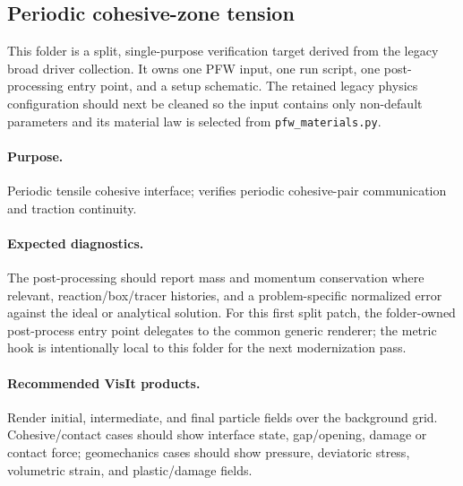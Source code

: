\subsection{Periodic cohesive-zone tension}
\label{sec:cohesiveZonePeriodic}

This folder is a split, single-purpose verification target derived from the
legacy broad driver collection.  It owns one PFW input, one run script, one
post-processing entry point, and a setup schematic.  The retained legacy physics
configuration should next be cleaned so the input contains only non-default
parameters and its material law is selected from \texttt{pfw\_materials.py}.

\paragraph{Purpose.} Periodic tensile cohesive interface; verifies periodic cohesive-pair communication and traction continuity.

\paragraph{Expected diagnostics.} The post-processing should report mass and
momentum conservation where relevant, reaction/box/tracer histories, and a
problem-specific normalized error against the ideal or analytical solution.  For
this first split patch, the folder-owned post-process entry point delegates to
the common generic renderer; the metric hook is intentionally local to this
folder for the next modernization pass.

\paragraph{Recommended VisIt products.} Render initial, intermediate, and final
particle fields over the background grid.  Cohesive/contact cases should show
interface state, gap/opening, damage or contact force; geomechanics cases should
show pressure, deviatoric stress, volumetric strain, and plastic/damage fields.
